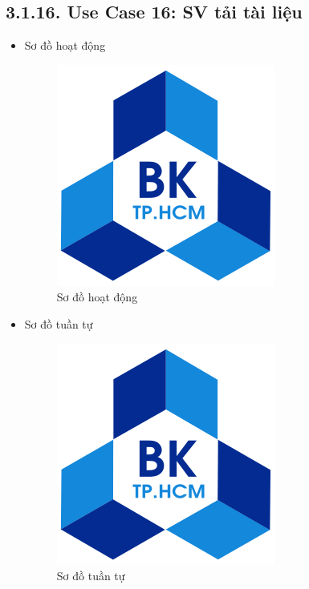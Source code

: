 \subsection*{3.1.16. Use Case 16: SV tải tài liệu}
\begin{itemize}
    \item Sơ đồ hoạt động
    \begin{figure}[H]
    \centering
    \includegraphics[scale=0.5 ]{Picture/hcmut.png}
    \caption{Sơ đồ hoạt động }
    \end{figure}
    \item Sơ đồ tuần tự
    \begin{figure}[H]
    \centering
    \includegraphics[scale=0.5 ]{Picture/hcmut.png}
    \caption{Sơ đồ tuần tự }
    \end{figure}
\end{itemize}
